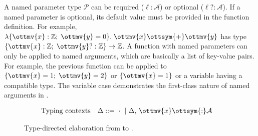 A named parameter type $\mathcal{P}$ can be required ($\ell:\mathcal{A}$) or optional
($\ell?:\mathcal{A}$). If a named parameter is optional, its default value must be
provided in the function definition. For example,
$\lambda\{\ottmv{x}: \mathbb{Z} ;\;\ottmv{y}=0\}.\;\ottmv{x}  \ottsym{+}  \ottmv{y}$ has type
$\{\ottmv{x}: \mathbb{Z} ;\;\ottmv{y}?: \mathbb{Z} \} \rightarrow  \mathbb{Z} $. A function with named
parameters can only be applied to named arguments, which are basically a list of
key-value pairs. For example, the previous function can be applied to
$\{\ottmv{x}=1;\;\ottmv{y}=2\}$ or $\{\ottmv{x}=1\}$ or a variable having a compatible type.
The variable case demonstrates the first-class nature of named arguments in \uaena.

\renewcommand{\IUdrulePElaXXOptional}[1]{\ottdrule[#1]{%
\ottpremise{ \Delta \,\vdash\, _{\!\!\!\! \ottmv{x} }\:\: \rho \ottsym{:} \mathcal{P} \,\rightsquigarrow\, \ottnt{letin} \,\dashv\, \Delta' }%
\ottpremise{\Delta'  \,\vdash\,  \epsilon  \ottsym{:}  \mathcal{A}  \,\rightsquigarrow\,  \ottnt{e}}%
}{
\Delta\,\vdash_{\!\ottmv{x}}\,\ottsym{(}  \rho  ;\,  \ell  \ottsym{=}  \epsilon  \ottsym{)}:\ottsym{(}  \mathcal{P}  ;\,  \ell  \ottsym{\mbox{?}}  \ottsym{:}  \mathcal{A}  \ottsym{)}\\
 \,\rightsquigarrow\,  \ottnt{letin} \circ \ottkw{let} \, \ell  \ottsym{=}  \ottkw{switch} \, \ottmv{x}  \ottsym{.}  \ell \, \ottkw{as} \, \ottmv{y} \, \ottkw{case} \, |  \mathcal{A}  |  \Rightarrow  \ottmv{y} \, \ottkw{case} \, \ottkw{Null}  \Rightarrow  \ottnt{e} \, \ottkw{in}  \,\dashv\, \Delta'  ,\,  \ell  \ottsym{:}  \mathcal{A}}{%
{\ottdrulename{PEla\_Optional}}{}%
}}

\begin{figure}
\begin{align*}
  &\text{Typing contexts}&\Delta ::=&~  \cdot  ~|~ \Delta  ,\,  \ottmv{x}  \ottsym{:}  \mathcal{A}
\end{align*}
\IUdefnelab{}
\IUdefnpelab{}
\caption{Type-directed elaboration from \uaena to \lambdaiu.} \label{fig:elab}
\end{figure}

